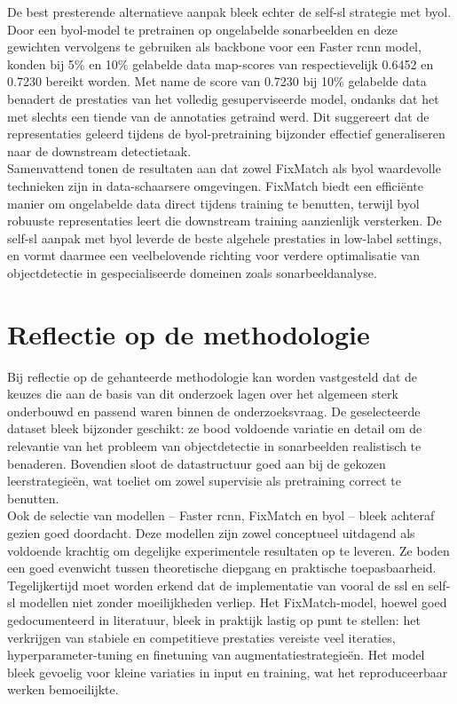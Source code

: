 De best presterende alternatieve aanpak bleek echter de \gls{self-sl} strategie met \gls{byol}. Door een \gls{byol}-model te pretrainen op ongelabelde sonarbeelden en deze gewichten vervolgens te gebruiken als backbone voor een Faster \gls{rcnn} model, konden bij 5\% en 10\% gelabelde data \gls{map}-scores van respectievelijk 0.6452 en 0.7230 bereikt worden. Met name de score van 0.7230 bij 10\% gelabelde data benadert de prestaties van het volledig gesuperviseerde model, ondanks dat het met slechts een tiende van de annotaties getraind werd. Dit suggereert dat de representaties geleerd tijdens de \gls{byol}-pretraining bijzonder effectief generaliseren naar de downstream detectietaak. \\

Samenvattend tonen de resultaten aan dat zowel FixMatch als \gls{byol} waardevolle technieken zijn in data-schaarsere omgevingen. FixMatch biedt een efficiënte manier om ongelabelde data direct tijdens training te benutten, terwijl \gls{byol} robuuste representaties leert die downstream training aanzienlijk versterken. De \gls{self-sl} aanpak met \gls{byol} leverde de beste algehele prestaties in low-label settings, en vormt daarmee een veelbelovende richting voor verdere optimalisatie van objectdetectie in gespecialiseerde domeinen zoals sonarbeeldanalyse.

\section{Reflectie op de methodologie}

Bij reflectie op de gehanteerde methodologie kan worden vastgesteld dat de keuzes die aan de basis van dit onderzoek lagen over het algemeen sterk onderbouwd en passend waren binnen de onderzoeksvraag. De geselecteerde dataset bleek bijzonder geschikt: ze bood voldoende variatie en detail om de relevantie van het probleem van objectdetectie in sonarbeelden realistisch te benaderen. Bovendien sloot de datastructuur goed aan bij de gekozen leerstrategieën, wat toeliet om zowel supervisie als pretraining correct te benutten. \\

Ook de selectie van modellen -- Faster \gls{rcnn}, FixMatch en \gls{byol} -- bleek achteraf gezien goed doordacht. Deze modellen zijn zowel conceptueel uitdagend als voldoende krachtig om degelijke experimentele resultaten op te leveren. Ze boden een goed evenwicht tussen theoretische diepgang en praktische toepasbaarheid. Tegelijkertijd moet worden erkend dat de implementatie van vooral de \gls{ssl} en \gls{self-sl} modellen niet zonder moeilijkheden verliep. Het FixMatch-model, hoewel goed gedocumenteerd in literatuur, bleek in praktijk lastig op punt te stellen: het verkrijgen van stabiele en competitieve prestaties vereiste veel iteraties, hyperparameter-tuning en finetuning van augmentatiestrategieën. Het model bleek gevoelig voor kleine variaties in input en training, wat het reproduceerbaar werken bemoeilijkte. \\

